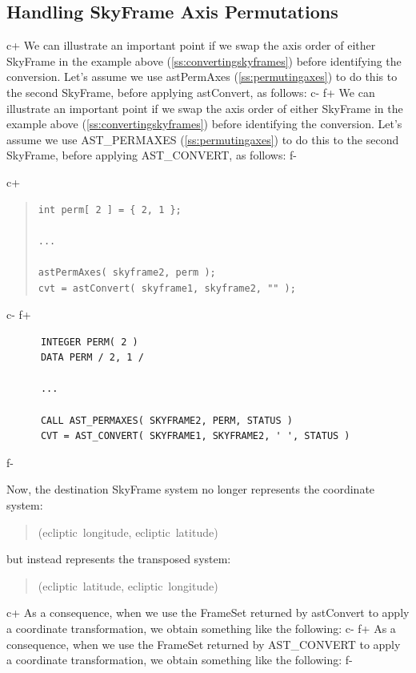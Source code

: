 \documentclass[twoside,11pt]{article}
\newcommand{\secref}[1]{\S\ref{#1}}
\renewcommand{\secref}[1]{\ref{#1}}
\begin{document}
\subsection{\label{ss:convertingpermutedaxes}Handling SkyFrame Axis Permutations}

c+
We can illustrate an important point if we swap the axis order of
either SkyFrame in the example above (\secref{ss:convertingskyframes})
before identifying the conversion. Let's assume we use astPermAxes
(\secref{ss:permutingaxes}) to do this to the second SkyFrame, before
applying astConvert, as follows:
c-
f+
We can illustrate an important point if we swap the axis order of
either SkyFrame in the example above (\secref{ss:convertingskyframes})
before identifying the conversion. Let's assume we use AST\_PERMAXES
(\secref{ss:permutingaxes}) to do this to the second SkyFrame, before
applying AST\_CONVERT, as follows:
f-

c+
\begin{quote}
\small
\begin{verbatim}
int perm[ 2 ] = { 2, 1 };

...

astPermAxes( skyframe2, perm );
cvt = astConvert( skyframe1, skyframe2, "" );
\end{verbatim}
\normalsize
\end{quote}
c-
f+
\small
\begin{verbatim}
      INTEGER PERM( 2 )
      DATA PERM / 2, 1 /

      ...

      CALL AST_PERMAXES( SKYFRAME2, PERM, STATUS )
      CVT = AST_CONVERT( SKYFRAME1, SKYFRAME2, ' ', STATUS )
\end{verbatim}
\normalsize
f-

Now, the destination SkyFrame system no longer represents the
coordinate system:

\begin{quote}
(ecliptic~longitude, ecliptic~latitude)
\end{quote}

but instead represents the transposed system:

\begin{quote}
(ecliptic~latitude, ecliptic~longitude)
\end{quote}

c+
As a consequence, when we use the FrameSet returned by astConvert to
apply a coordinate transformation, we obtain something like the
following:
c-
f+
As a consequence, when we use the FrameSet returned by AST\_CONVERT to
apply a coordinate transformation, we obtain something like the
following:
f-
\end{document}
